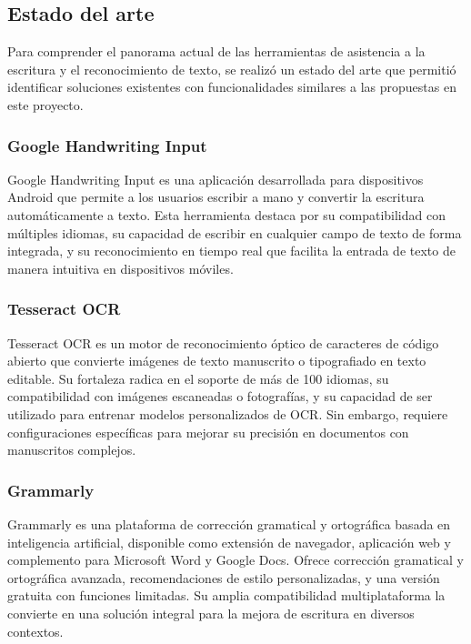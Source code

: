 \subsection{Estado del arte}

Para comprender el panorama actual de las herramientas de asistencia a la escritura y el reconocimiento de texto, se realizó un estado del arte que permitió identificar soluciones existentes con funcionalidades similares a las propuestas en este proyecto.

\subsubsection{Google Handwriting Input}
Google Handwriting Input \cite{google2024handwriting} es una aplicación desarrollada para dispositivos Android que permite a los usuarios escribir a mano y convertir la escritura automáticamente a texto. Esta herramienta destaca por su compatibilidad con múltiples idiomas, su capacidad de escribir en cualquier campo de texto de forma integrada, y su reconocimiento en tiempo real que facilita la entrada de texto de manera intuitiva en dispositivos móviles.

\subsubsection{Tesseract OCR}
Tesseract OCR \cite{smith2007overview} es un motor de reconocimiento óptico de caracteres de código abierto que convierte imágenes de texto manuscrito o tipografiado en texto editable. Su fortaleza radica en el soporte de más de 100 idiomas, su compatibilidad con imágenes escaneadas o fotografías, y su capacidad de ser utilizado para entrenar modelos personalizados de OCR. Sin embargo, requiere configuraciones específicas para mejorar su precisión en documentos con manuscritos complejos.

\subsubsection{Grammarly}
Grammarly \cite{grammarly2024} es una plataforma de corrección gramatical y ortográfica basada en inteligencia artificial, disponible como extensión de navegador, aplicación web y complemento para Microsoft Word y Google Docs. Ofrece corrección gramatical y ortográfica avanzada, recomendaciones de estilo personalizadas, y una versión gratuita con funciones limitadas. Su amplia compatibilidad multiplataforma la convierte en una solución integral para la mejora de escritura en diversos contextos.

